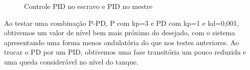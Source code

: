 \documentclass[a4paper,12pt]{article}
\begin{document}
\begin{figure}[H]
     \centering
\hspace{1cm}
     
     \caption{Controle PID no escravo e PID no mestre}
     \label{fig:ControlePIDPID}
\end{figure}
Ao testar uma combinação P-PD, P com kp=3 e PD com kp=1 e kd=0,001, obtivemos um valor de nível bem mais próximo do desejado, com o sistema apresentando uma forma menos ondulatória do que nos testes anteriores. Ao trocar o PD por um PID, obtivemos uma fase transitória um pouco reduzida e uma queda considerável no nível do tanque.
\end{document}
